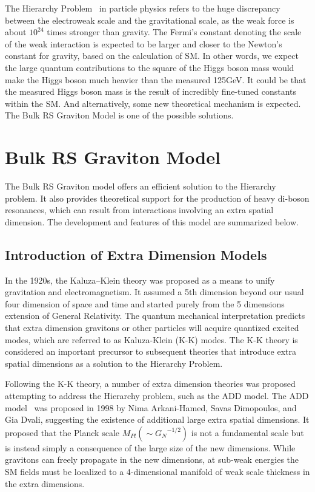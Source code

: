 \vspace{0.3cm}
The Hierarchy Problem~\cite{intro_hierarchy} in particle physics refers to the huge discrepancy between the electroweak scale and the gravitational scale, as the weak force is about $10^{24}$ times stronger than gravity. The Fermi's constant denoting the scale of the weak interaction is expected to be larger and closer to the Newton's constant for gravity, based on the calculation of SM. In other words, we expect the large quantum contributions to the square of the Higgs boson mass would make the Higgs boson much heavier than the measured 125GeV. It could be that the measured Higgs boson mass is the result of incredibly fine-tuned constants within the SM. And alternatively, some new theoretical mechanism is expected. The Bulk RS Graviton Model is one of the possible solutions.

\section{Bulk RS Graviton Model}
The Bulk RS Graviton model offers an efficient solution to the Hierarchy problem. It also provides theoretical support for the production of heavy di-boson resonances, which can result from interactions involving an extra spatial dimension. The development and features of this model are summarized below.
\subsection{Introduction of Extra Dimension Models}
In the 1920s, the Kaluza–Klein theory was proposed as a means to unify gravitation and electromagnetism. It assumed a 5th dimension beyond our usual four dimension of space and time and started purely from the 5 dimensions extension of General Relativity. The quantum mechanical interpretation predicts that extra dimension gravitons or other particles will acquire quantized excited modes, which are referred to as Kaluza-Klein (K-K) modes. The K-K theory is considered an important precursor to subsequent theories that introduce extra spatial dimensions as a solution to the Hierarchy Problem.

\vspace{0.3cm}
Following the K-K theory, a number of extra dimension theories was proposed attempting to address the Hierarchy problem, such as the ADD model. The ADD model~\cite{Intro_ADD,Intro_ADD2} was proposed in 1998 by Nima Arkani-Hamed, Savas Dimopoulos, and Gia Dvali, suggesting the existence of additional large extra spatial dimensions. It proposed that the Planck scale $M_{Pl}(\sim{G_{N}}^{-1/2})$ is not a fundamental scale but is instead simply a consequence of the large size of the new dimensions. While gravitons can freely propagate in the new dimensions, at sub-weak energies the SM fields must be localized to a 4-dimensional manifold of weak scale thickness in the extra dimensions. 


